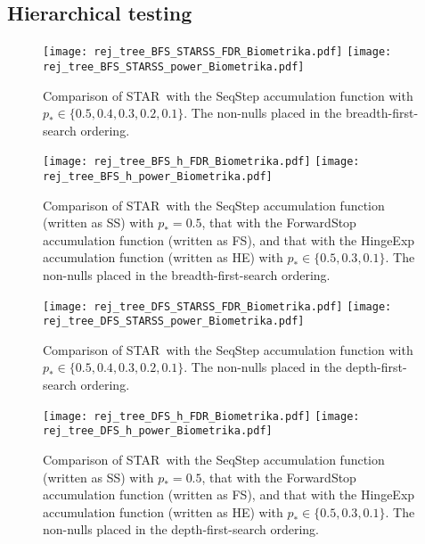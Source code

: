 \documentclass{biometrika}
\renewcommand{\star}{STAR}
\newcommand{\pth}{p_{*}}
\newcommand{\1}{\mathbf{1}}
\begin{document}
\newpage
\subsection{Hierarchical testing}\label{app:experiment_tree}
\begin{figure}[h]
  \centering
  \texttt{[image: rej\_tree\_BFS\_STARSS\_FDR\_Biometrika.pdf]}
  \texttt{[image: rej\_tree\_BFS\_STARSS\_power\_Biometrika.pdf]}
  \caption{Comparison of \star ~with the SeqStep accumulation function with $\pth\in \{0.5, 0.4, 0.3, 0.2, 0.1\}$. The non-nulls placed in the breadth-first-search ordering. }\label{fig:rej_tree_BFS_STARSS}
\end{figure}

\begin{figure}[h]
  \centering
  \texttt{[image: rej\_tree\_BFS\_h\_FDR\_Biometrika.pdf]}
  \texttt{[image: rej\_tree\_BFS\_h\_power\_Biometrika.pdf]}
  \caption{Comparison of \star ~with the SeqStep accumulation function (written as SS) with $\pth = 0.5$, that with the ForwardStop accumulation function (written as FS), and that with the HingeExp accumulation function (written as HE) with $\pth\in \{0.5, 0.3, 0.1\}$. The non-nulls placed in the breadth-first-search ordering. }\label{fig:rej_tree_h}
\end{figure}

\begin{figure}[h]
  \centering
  \texttt{[image: rej\_tree\_DFS\_STARSS\_FDR\_Biometrika.pdf]}
  \texttt{[image: rej\_tree\_DFS\_STARSS\_power\_Biometrika.pdf]}
  \caption{Comparison of \star ~with the SeqStep accumulation function with $\pth\in \{0.5, 0.4, 0.3, 0.2, 0.1\}$. The non-nulls placed in the depth-first-search ordering. }\label{fig:rej_tree_depth-first-search_STARSS}
\end{figure}

\begin{figure}[h]
  \centering
  \texttt{[image: rej\_tree\_DFS\_h\_FDR\_Biometrika.pdf]}
  \texttt{[image: rej\_tree\_DFS\_h\_power\_Biometrika.pdf]}
  \caption{Comparison of \star ~with the SeqStep accumulation function (written as SS) with $\pth = 0.5$, that with the ForwardStop accumulation function (written as FS), and that with the HingeExp accumulation function (written as HE) with $\pth\in \{0.5, 0.3, 0.1\}$. The non-nulls placed in the depth-first-search ordering. }\label{fig:rej_tree_h}
\end{figure}
\end{document}
